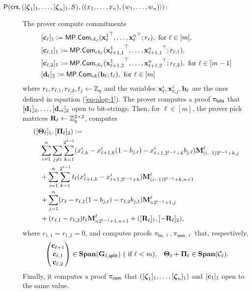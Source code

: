 \begin{description}
\item[{\(\mathsf{P}(\mathsf{crs}, ([{\boldsymbol \zeta}_1]_1, \ldots, [{\boldsymbol \zeta}_n]_1,S), \langle (x_1,\ldots,x_n),(w_1,\ldots,w_n) \rangle)\)}:]
The prover compute commitments
\begin{align*}
&[\mathbf{c}_\ell]_1:=\mathsf{MP}.\mathsf{Com}_{ck_\ell}({\mathbf{x}_\ell^1}^\top,\ldots,{\mathbf{x}_\ell^n}^\top;r_\ell), \text{ for } \ell \in [m],\\
&[\mathbf{c}_{\ell,1}]_1:=\mathsf{MP}.\mathsf{Com}_{ck_\ell}({\mathbf{x}^1_{\ell+1,1}}^\top,\ldots,{\mathbf{x}^n_{\ell+1,1}}^\top;r_{\ell,1}),\\
&[\mathbf{c}_{\ell,2}]_1:=\mathsf{MP}.\mathsf{Com}_{ck_\ell}({\mathbf{x}^1_{\ell+1,2}}^\top,\ldots,{\mathbf{x}^n_{\ell+1,2}}^\top;r_{\ell,2}), \text{ for } \ell\in[m-1]\\
&[\mathbf{d}_\ell]_2:=\mathsf{MP}.\mathsf{Com}_{ck}(\mathbf{b}_\ell;t_\ell),\text{ for } \ell\in[m]
\end{align*}
 where \(r_\ell,r_{\ell,1},r_{\ell,2},t_j\gets\mathbb{Z}_q\) and the variables \(\mathbf{x}^i_\ell,\mathbf{x}^i_{\ell,j},\mathbf{b}_\ell\) are the ones defined in equation (\ref{eq-alog-1}). The prover computes a proof \(\pi_{\mathsf{bits}}\) that \([\mathbf{d}_1]_2,\ldots,[\mathbf{d}_m]_2\) open to bit-strings. Then, for \(\ell\in [m]\), the prover pick matrices \(\mathbf{{R}}_\ell\gets\mathbb{Z}_q^{2\times 2}\), computes
\begin{align*}
&([\mathbf{{\Theta}}_\ell]_1,[\mathbf{{\Pi}}_\ell]_2)  := \\
&\quad \sum_{i=1}^n\sum_{j\neq i}\sum_{k=1}^{2^{\ell-1}}(x^i_{\ell,k}-x^i_{\ell+1,k}(1-b_{j,\ell})-x^i_{\ell+1,2^{\ell-1}+k}b_{j,\ell})\mathbf{{M}}_{(i-1)2^{\ell-1}+k,j}^\ell\\
&\quad+ \sum_{i=1}^n\sum_{k=1}^{2^{\ell-1}}t_\ell(x^i_{\ell+1,k}-x^i_{\ell+1,2^{\ell-1}+k})\mathbf{{M}}_{(i-1)2^{\ell-1}+k,n+1}^\ell \\
&\quad+ \sum_{j=1}^n (r_\ell-r_{\ell,1}(1-b_{j,\ell})-r_{\ell,2}b_{j,\ell})\mathbf{{M}}_{n2^{\ell-1}+1,j}^\ell \\
&\quad+(r_{\ell,1}-r_{\ell,2})t_\ell\mathbf{{M}}^\ell_{n2^{\ell-1}+1,n+1}+([\mathbf{{R}}_\ell]_1,[-\mathbf{{R}}_\ell]_2),
\end{align*}
where \(r_{1,1}=r_{1,2}=0\), and computes proofs $\pi_{\mathsf{lin},\ell},\pi_{\mathsf{sum},\ell}$ that, respectively,
\begin{align*}
&\begin{pmatrix}
\mathbf{c}_{\ell+1}\\\mathbf{c}_{\ell,1}\\\mathbf{c}_{\ell,2}
\end{pmatrix}\in
\mathbf{Span}(\mathbf{{G}}_{\ell,\mathsf{split}})\ (\text{ if }\ell< m), &\mathbf{{\Theta_\ell}}+\mathbf{{\Pi_\ell}}\in\mathbf{Span}(\mathcal{C}_\ell).
\end{align*}
Finally, it computes a proof \(\pi_{\mathsf{com}}\) that \(([{\boldsymbol \zeta}_1]_1,\ldots,[{\boldsymbol \zeta}_n]_1)\) and \([\mathbf{c}_1]_1\) open to the same value.


\end{description}
